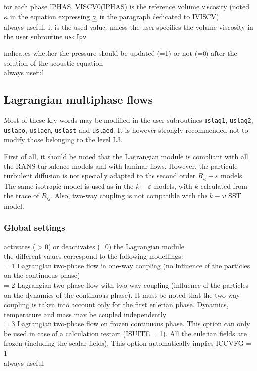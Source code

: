 {for each phase IPHAS, VISCV0(IPHAS) is the reference volume viscosity
(noted $\kappa$ in the equation expressing $\underline{\underline{\sigma}}$ in the
paragraph dedicated to IVISCV)\\
always useful, it is the used value, unless the user specifies the volume
viscosity in the user subroutine \texttt{uscfpv}}

{indicates whether the pressure should be updated (=1) or not (=0) after the
solution of the acoustic equation\\
always useful}

\subsection{Lagrangian multiphase flows}
\label{prg_motscles_lagr}

Most of these key words may be modified in the user subroutines
\texttt{uslag1}, \texttt{uslag2}, \texttt{uslabo}, \texttt{uslaen},
\texttt{uslast} and \texttt{uslaed}. It is however strongly recommended
not to modify those belonging to the level L3.

First of all, it should be noted that the Lagrangian module is compliant with
all the RANS turbulence models and with laminar flows. However, the particule
turbulent diffusion is not specially adapted to the second order
$R_{ij}-\varepsilon$ models. The same isotropic model is used as in the
$k-\varepsilon$ models, with $k$ calculated from the trace of $R_{ij}$. Also,
two-way coupling is not compatible with the $k-\omega$ SST model.


\subsubsection{Global settings}

{activates ($>$0) or deactivates (=0) the Lagrangian module\\
the different values correspond to the following modellings: \\ 
\hspace*{1.3cm} = 1 Lagrangian two-phase flow in one-way coupling (no influence of
the particles on the continuous phase)\\
\hspace*{1.3cm} = 2 Lagrangian two-phase flow with two-way coupling (influence of
the particles on the dynamics of the continuous phase).
It must be noted that the two-way coupling is taken
into account only for the first eulerian phase. Dynamics,
temperature and mass may be coupled independently\\ 
\hspace*{1.3cm} = 3 Lagrangian two-phase flow on frozen continuous phase. This option can
only be used in case of a calculation restart (ISUITE = 1). All the eulerian
fields are frozen (including the scalar fields). This option automatically
implies ICCVFG = 1\\
always useful}

